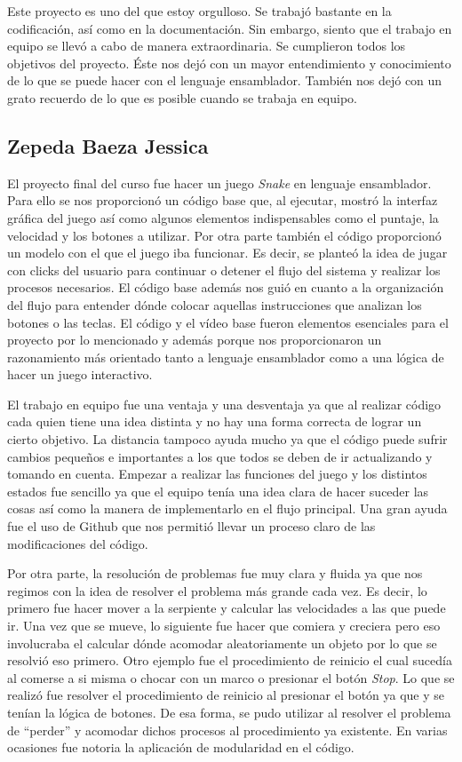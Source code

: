 \documentclass[12pt]{article}
\begin{document}
Este proyecto es uno del que estoy orgulloso. Se trabajó bastante en la codificación, así como en la documentación. Sin embargo, siento que el trabajo en equipo se llevó a cabo de manera extraordinaria. Se cumplieron todos los objetivos del proyecto. Éste nos dejó con un mayor entendimiento y conocimiento de lo que se puede hacer con el lenguaje ensamblador. También nos dejó con un grato recuerdo de lo que es posible cuando se trabaja en equipo. 

\subsection*{Zepeda Baeza Jessica}
El proyecto final del curso fue hacer un juego \textit{Snake} en lenguaje ensamblador. Para ello se nos proporcionó un código base que, al ejecutar, mostró la interfaz gráfica del juego así como algunos elementos indispensables como el puntaje, la velocidad y los botones a utilizar. Por otra parte también el código proporcionó un modelo con el que el juego iba funcionar. Es decir, se planteó la idea de jugar con clicks del usuario para continuar o detener el flujo del sistema y realizar los procesos necesarios. El código base además nos guió en cuanto a la organización del flujo para entender dónde colocar aquellas instrucciones que analizan los botones o las teclas. El código y el vídeo base fueron elementos esenciales para el proyecto por lo mencionado y además porque nos proporcionaron un razonamiento más orientado tanto a lenguaje ensamblador como a una lógica de hacer un juego interactivo. 

El trabajo en equipo fue una ventaja y una desventaja ya que al realizar código cada quien tiene una idea distinta y no hay una forma correcta de lograr un cierto objetivo. La distancia tampoco ayuda mucho ya que el código puede sufrir cambios pequeños e importantes a los que todos se deben de ir actualizando y tomando en cuenta. Empezar a realizar las funciones del juego y los distintos estados fue sencillo ya que el equipo tenía una idea clara de hacer suceder las cosas así como la manera de implementarlo en el flujo principal. Una gran ayuda fue el uso de Github que nos permitió llevar un proceso claro de las modificaciones del código. 

Por otra parte, la resolución de problemas fue muy clara y fluida ya que nos regimos con la idea de resolver el problema más grande cada vez. Es decir, lo primero fue hacer mover a la serpiente y calcular las velocidades a las que puede ir. Una vez que se mueve, lo siguiente fue hacer que comiera y creciera pero eso involucraba el calcular dónde acomodar aleatoriamente un objeto por lo que se resolvió eso primero. Otro ejemplo fue el procedimiento de reinicio el cual sucedía al comerse a si misma o chocar con un marco o presionar el botón \textit{Stop}. Lo que se realizó fue resolver el procedimiento de reinicio al presionar el botón ya que y se tenían la lógica de botones. De esa forma, se pudo utilizar al resolver el problema de “perder” y acomodar dichos procesos al procedimiento ya existente. En varias ocasiones fue notoria la aplicación de modularidad en el código.
\end{document}
